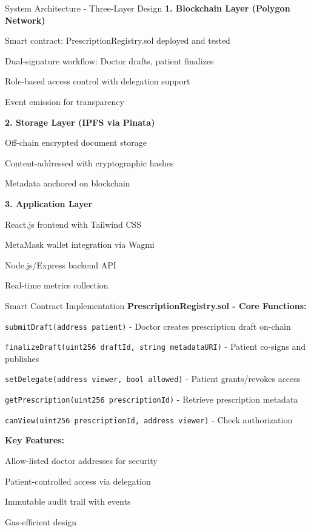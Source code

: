 \documentclass[10pt]{beamer}
\let\olditemize\itemize
\let\endolditemize\enditemize
\renewenvironment{itemize}
  {\olditemize\justifying}
  {\endolditemize}
\begin{document}
\begin{frame}{System Architecture - Three-Layer Design}
\textbf{1. Blockchain Layer (Polygon Network)}
\begin{itemize}
\item Smart contract: PrescriptionRegistry.sol deployed and tested
\item Dual-signature workflow: Doctor drafts, patient finalizes
\item Role-based access control with delegation support
\item Event emission for transparency
\end{itemize}

\textbf{2. Storage Layer (IPFS via Pinata)}
\begin{itemize}
\item Off-chain encrypted document storage
\item Content-addressed with cryptographic hashes
\item Metadata anchored on blockchain
\end{itemize}

\textbf{3. Application Layer}
\begin{itemize}
\item React.js frontend with Tailwind CSS
\item MetaMask wallet integration via Wagmi
\item Node.js/Express backend API
\item Real-time metrics collection
\end{itemize}
\end{frame}

\begin{frame}[fragile]{Smart Contract Implementation}
\textbf{PrescriptionRegistry.sol - Core Functions:}

\begin{itemize}
\item \texttt{submitDraft(address patient)} - Doctor creates prescription draft on-chain
\item \texttt{finalizeDraft(uint256 draftId, string metadataURI)} - Patient co-signs and publishes
\item \texttt{setDelegate(address viewer, bool allowed)} - Patient grants/revokes access
\item \texttt{getPrescription(uint256 prescriptionId)} - Retrieve prescription metadata
\item \texttt{canView(uint256 prescriptionId, address viewer)} - Check authorization
\end{itemize}

\vspace{0.3cm}
\textbf{Key Features:}
\begin{itemize}
\item Allow-listed doctor addresses for security
\item Patient-controlled access via delegation
\item Immutable audit trail with events
\item Gas-efficient design
\end{itemize}
\end{frame}
\end{document}

